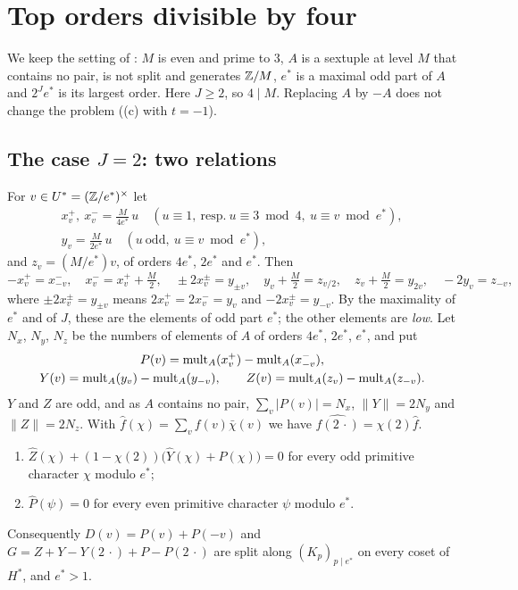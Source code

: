 \section{Top orders divisible by four}\label{sec:four}

We keep the setting of : $M$ is even and prime to $3$, $A$ is
a sextuple at level $M$ that contains no pair, is not split and generates
$\mathbb{Z}/M$, $e^{*}$ is a maximal odd part of $A$ and $2^{J}e^{*}$ is its largest
order. Here $J\ge2$, so $4\mid M$. Replacing $A$ by $-A$ does not change the
problem ((c) with $t=-1$).

\subsection{The case \texorpdfstring{$J=2$}{J=2}: two relations}
For $v\in U^{*}=(\mathbb{Z}/e^{*})^{\times}$ let
\begin{gather*}
  x^{+}_{v},\ x^{-}_{v}=\tfrac{M}{4e^{*}}\,u\quad(u\equiv1,\ \text{resp.}\
  u\equiv3\bmod4,\ u\equiv v\bmod e^{*}),\\
  y_{v}=\tfrac{M}{2e^{*}}\,u\quad(u\ \text{odd},\ u\equiv v\bmod e^{*}),
\end{gather*}
and $z_{v}=(M/e^{*})v$, of orders $4e^{*}$, $2e^{*}$ and $e^{*}$. Then
\[
  -x^{+}_{v}=x^{-}_{-v},\quad x^{-}_{v}=x^{+}_{v}+\tfrac M2,\quad
  \pm2x^{\pm}_{v}=y_{\pm v},\quad y_{v}+\tfrac M2=z_{v/2},\quad
  z_{v}+\tfrac M2=y_{2v},\quad -2y_{v}=z_{-v},
\]
where $\pm2x^{\pm}_{v}=y_{\pm v}$ means $2x^{+}_{v}=2x^{-}_{v}=y_{v}$ and
$-2x^{\pm}_{v}=y_{-v}$. By the maximality of $e^{*}$ and of $J$, these are
the elements of odd part $e^{*}$; the other elements are \emph{low}. Let
$N_{x}$, $N_{y}$, $N_{z}$ be the numbers of elements of $A$ of orders $4e^{*}$,
$2e^{*}$, $e^{*}$, and put
\begin{gather*}
  P(v)=\operatorname{mult}_{A}(x^{+}_{v})-\operatorname{mult}_{A}(x^{-}_{-v}),\\
  Y(v)=\operatorname{mult}_{A}(y_{v})-\operatorname{mult}_{A}(y_{-v}),\qquad
  Z(v)=\operatorname{mult}_{A}(z_{v})-\operatorname{mult}_{A}(z_{-v}).
\end{gather*}
$Y$ and $Z$ are odd, and as $A$ contains no pair, $\sum_{v}|P(v)|=N_{x}$,
$\|Y\|=2N_{y}$ and $\|Z\|=2N_{z}$. With $\hat f(\chi)=\sum_{v}f(v)\bar
\chi(v)$ we have $\widehat{f(2\,\cdot)}=\chi(2)\hat f$.

\begin{lemma}\label{lem:R12}
\begin{enumerate}[label=\textup{(R\arabic*)}]
\item $\hat Z(\chi)+(1-\chi(2))\bigl(\hat Y(\chi)+\hat P(\chi)\bigr)=0$ for
every odd primitive character $\chi$ modulo $e^{*}$;
\item $\hat P(\psi)=0$ for every even primitive character $\psi$ modulo
$e^{*}$.
\end{enumerate}
Consequently $D(v)=P(v)+P(-v)$ and $G=Z+Y-Y(2\,\cdot)+P-P(2\,\cdot)$ are split
along $(K_{p})_{p\mid e^{*}}$ on every coset of $H^{*}$, and $e^{*}>1$.
\end{lemma}

